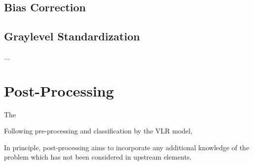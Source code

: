 

\subsection{Bias Correction}\label{ss:meth-bias}
\subsection{Graylevel Standardization}\label{ss:meth-ystd}
\par...\par
\clearpage
\section{Post-Processing}\label{s:meth-post}
The 

Following pre-processing and classification by the VLR model, 

In principle, post-processing aims to incorporate any additional knowledge of the problem which has not been considered in upstream elements. 




\clearpage
